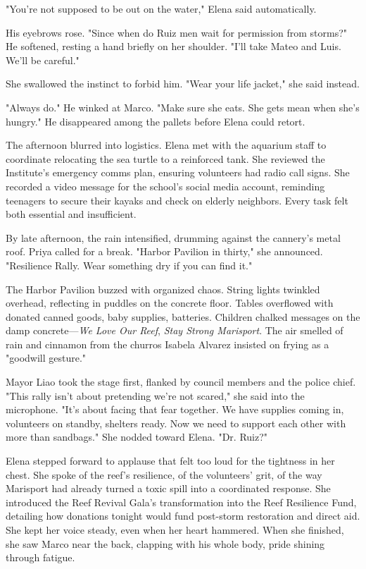 "You're not supposed to be out on the water," Elena said automatically.

His eyebrows rose. "Since when do Ruiz men wait for permission from storms?" He softened, resting a hand briefly on her shoulder. "I'll take Mateo and Luis. We'll be careful."

She swallowed the instinct to forbid him. "Wear your life jacket," she said instead.

"Always do." He winked at Marco. "Make sure she eats. She gets mean when she's hungry." He disappeared among the pallets before Elena could retort.

The afternoon blurred into logistics. Elena met with the aquarium staff to coordinate relocating the sea turtle to a reinforced tank. She reviewed the Institute's emergency comms plan, ensuring volunteers had radio call signs. She recorded a video message for the school's social media account, reminding teenagers to secure their kayaks and check on elderly neighbors. Every task felt both essential and insufficient.

By late afternoon, the rain intensified, drumming against the cannery's metal roof. Priya called for a break. "Harbor Pavilion in thirty," she announced. "Resilience Rally. Wear something dry if you can find it."

The Harbor Pavilion buzzed with organized chaos. String lights twinkled overhead, reflecting in puddles on the concrete floor. Tables overflowed with donated canned goods, baby supplies, batteries. Children chalked messages on the damp concrete—\textit{We Love Our Reef}, \textit{Stay Strong Marisport}. The air smelled of rain and cinnamon from the churros Isabela Alvarez insisted on frying as a "goodwill gesture."

Mayor Liao took the stage first, flanked by council members and the police chief. "This rally isn't about pretending we're not scared," she said into the microphone. "It's about facing that fear together. We have supplies coming in, volunteers on standby, shelters ready. Now we need to support each other with more than sandbags." She nodded toward Elena. "Dr. Ruiz?"

Elena stepped forward to applause that felt too loud for the tightness in her chest. She spoke of the reef's resilience, of the volunteers' grit, of the way Marisport had already turned a toxic spill into a coordinated response. She introduced the Reef Revival Gala's transformation into the Reef Resilience Fund, detailing how donations tonight would fund post-storm restoration and direct aid. She kept her voice steady, even when her heart hammered. When she finished, she saw Marco near the back, clapping with his whole body, pride shining through fatigue.

